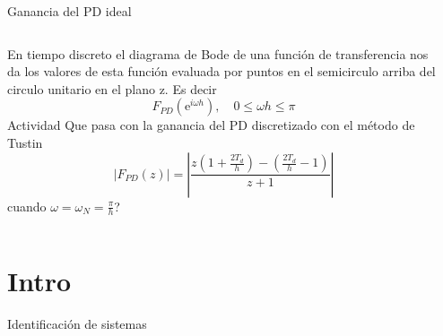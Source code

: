 \documentclass[presentation,aspectratio=169]{beamer}
\begin{document}
\begin{frame}[label={sec:orgb490c71}]{Ganancia del PD ideal}
\begin{columns}
\begin{column}{0.65\columnwidth}
En tiempo discreto el diagrama de Bode de una función de transferencia nos da los valores de esta función evaluada por puntos en el semicirculo arriba del circulo unitario en el plano z. Es decir
\[F_{PD}(\mathrm{e}^{i\omega h}), \quad 0 \le \omega h \le \pi \]
\alert{Actividad} Que pasa con la ganancia del PD discretizado con el método de Tustin \[|F_{PD}(z)| = \left | \frac{z(1 + \frac{2T_d}{h}) - (\frac{2T_d}{h}-1)}{z + 1} \right|\]
cuando \(\omega = \omega_N = \frac{\pi}{h}\)?
\end{column}
\begin{column}{0.35\columnwidth}
\begin{center}
\end{center}
\end{column}
\end{columns}
\end{frame}

\section{Intro}
\label{sec:org46be661}
\begin{frame}[label={sec:org0a68327}]{Identificación de sistemas}
\end{frame}
\end{document}
